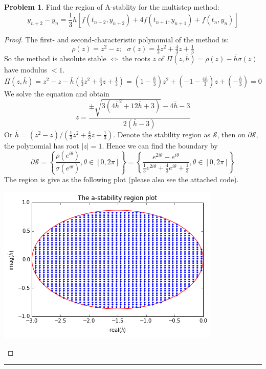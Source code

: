 \documentclass[a4paper, 10pt]{article}
\theoremstyle{definition}
\newtheorem{problem}{Problem}
\theoremstyle{hSol}
\begin{document}
\begin{problem} Find the region of A-stablity for the multistep method:
$$
y_{n+2} - y_n = \frac{1}{3}h [f(t_{n+2}, y_{n+2}) + 4f(t_{n+1}, y_{n+1}) + f(t_n, y_n) ]
$$
\end{problem}
\begin{proof} The first- and second-characteristic polynomial of the method is:
$$
\rho(z) = z^2 - z;~~~\sigma(z) = \tfrac{1}{3}z^2+\tfrac{4}{3}z+\tfrac{1}{3}
$$
So the method is absolute stable $\iff$ the roots $z$ of $\Pi(z,\bar{h})=\rho(z)-\bar{h}\sigma(z)$ have modulus $<1$.
\begin{equation}
  \Pi(z,\bar{h}) = z^2 - z - \bar{h}\left(\tfrac{1}{3}z^2+\tfrac{4}{3}z+\tfrac{1}{3}\right) = (1-\tfrac{\bar{h}}{3})z^2 + (-1-\tfrac{4\bar{h}}{3})z + (-\tfrac{\bar{h}}{3}) = 0
\end{equation}
We solve the equation and obtain
$$
z = \frac{\pm\sqrt{3(4 \bar{h}^2+12 \bar{h}+3)}-4 \bar{h}-3}{2 (\bar{h}-3)}
$$
Or $\bar{h} = (z^2 - z)/(\tfrac{1}{3}z^2+\tfrac{4}{3}z+\tfrac{1}{3})$. Denote the stability region as $\mathcal{S}$, then on $\partial \mathcal{S}$, the polynomial has root $|z|=1$. Hence we can find the boundary by
$$
\partial \mathcal{S} = \left\{\frac{\rho(e^{i\theta})}{\sigma(e^{i\theta})}, \theta\in [0, 2\pi]\right\} =  \left\{\frac{e^{2i\theta} - e^{i\theta}}{\tfrac{1}{3}e^{2i\theta}+\tfrac{4}{3}e^{i\theta}+\tfrac{1}{3}}, \theta\in [0, 2\pi]\right\}
$$
The region is give as the following plot (please also see the attached code).
\begin{center}
\includegraphics[scale=0.7]{hw2_p2.png}
\end{center}
\end{proof} 
\noindent\rule{16cm}{0.4pt}
\end{document}
